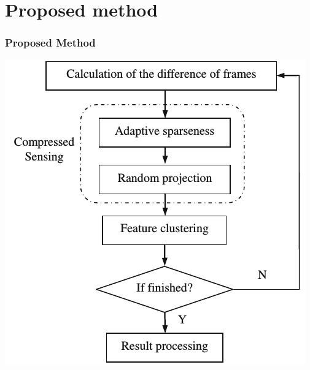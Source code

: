 \section{Proposed method}

\begin{frame}\frametitle{Proposed Method}
\includegraphics[scale=0.5]{figure/flow.png}
\end{frame}
